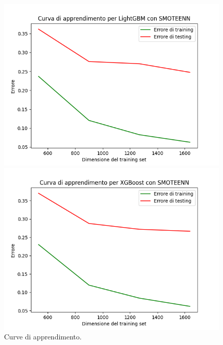 \begin{figure}[H]
    \begin{minipage}[b]{0.45\linewidth}
      \centering
      \includegraphics[scale=0.5]{img/learning_curve_LightGBM_SMOTEENN.png}
      
    \end{minipage}
    \hfill
    \begin{minipage}[b]{0.45\linewidth}
      \centering
      \includegraphics[scale=0.5]{img/learning_curve_XGBoost_SMOTEENN.png}
      
    \end{minipage}
    \caption{Curve di apprendimento.}
    
    \end{figure}



